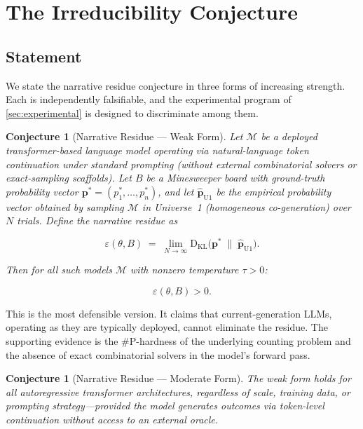 \documentclass[12pt,a4paper]{article}
\newtheorem{conjecture}[theorem]{Conjecture}
\theoremstyle{definition}
\theoremstyle{remark}
\newcommand{\KL}{\mathrm{D}_{\mathrm{KL}}}
\begin{document}
\section{The Irreducibility Conjecture}
\label{sec:irreducibility}

\subsection{Statement}

We state the narrative residue conjecture in three forms of increasing
strength.  Each is independently falsifiable, and the experimental
program of \cref{sec:experimental} is designed to discriminate among
them.

\begin{conjecture}[Narrative Residue --- Weak Form]
\label{conj:residue-weak}
Let $\mathcal{M}$ be a deployed transformer-based language model
operating via natural-language token continuation under standard
prompting (without external combinatorial solvers or exact-sampling
scaffolds).  Let $B$ be a Minesweeper board with ground-truth
probability vector $\mathbf{p}^* = (p_1^*, \ldots, p_n^*)$, and let
$\hat{\mathbf{p}}_{\mathrm{U1}}$ be the empirical probability vector
obtained by sampling $\mathcal{M}$ in Universe~1 (homogeneous
co-generation) over $N$ trials.  Define the narrative residue as

\begin{equation}\label{eq:residue}
  \varepsilon(\theta, B) \;=\;
    \lim_{N \to \infty}
    \KL\!\bigl(\mathbf{p}^* \;\|\; \hat{\mathbf{p}}_{\mathrm{U1}}\bigr).
\end{equation}

Then for all such models $\mathcal{M}$ with nonzero temperature
$\tau > 0$:

\begin{equation}\label{eq:conjecture-weak}
  \varepsilon(\theta, B) > 0.
\end{equation}
\end{conjecture}

This is the most defensible version.  It claims that current-generation
LLMs, operating as they are typically deployed, cannot eliminate the
residue.  The supporting evidence is the \textsc{\#P}-hardness of the
underlying counting problem and the absence of exact combinatorial
solvers in the model's forward pass.

\begin{conjecture}[Narrative Residue --- Moderate Form]
\label{conj:residue-moderate}
The weak form holds for all autoregressive transformer architectures,
regardless of scale, training data, or prompting strategy---provided
the model generates outcomes via token-level continuation without
access to an external oracle.
\end{conjecture}
\end{document}

